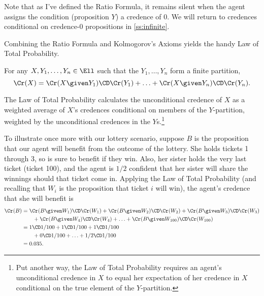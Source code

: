 Note that as I've defined the Ratio Formula, it remains silent when the agent assigns the condition (proposition $Y$) a credence of $0$. We will return to credences conditional on credence-$0$ propositions in \autoref{ss:infinite}.

Combining the Ratio Formula and Kolmogorov's Axioms yields the handy Law of Total Probability.
\begin{description}\label{p:LTP}
\item[Law of Total Probability.\,] {For any $X, Y_1, \ldots, Y_n \in \Ell$ such that the $Y_1, \ldots, Y_n$ form a finite partition, $$\Cr(X)=\Cr(X \given Y_1) \CD \Cr(Y_1) + \ldots + \Cr(X \given Y_n) \CD \Cr(Y_n).$$}
\end{description} 
The Law of Total Probability calculates the unconditional credence of $X$ as a weighted average of $X$'s credences conditional on members of the $Y$-partition, weighted by the unconditional credences in the $Y$s.\footnote
{Put another way, the Law of Total Probability requires an agent's unconditional credence in $X$ to equal her expectation of her credence in $X$ conditional on the true element of the $Y$-partition.}

To illustrate once more with our lottery scenario, suppose $B$ is the proposition that our agent will benefit from the outcome of the lottery. She holds tickets 1 through 3, so is sure to benefit if they win. Also, her sister holds the very last ticket (ticket 100), and the agent is $1/2$ confident that her sister will share the winnings should that ticket come in. Applying the Law of Total Probability (and recalling that $W_i$ is the proposition that ticket $i$ will win), the agent's credence that she will benefit is
\begin{equation}
\begin{aligned}
\Cr(B) &= \Cr(B \given W_1)\CD\Cr(W_1)+\Cr(B \given W_2)\CD\Cr(W_2)+\Cr(B \given W_3)\CD\Cr(W_3)\\
	   &\qquad +\Cr(B \given W_4)\CD\Cr(W_4)+\ldots+\Cr(B \given W_{100})\CD\Cr(W_{100})\\
	   &= 1 \CD 1/100 + 1 \CD 1/100 + 1 \CD 1/100\\
	   &\qquad + 0 \CD 1/100 + \ldots + 1/2 \CD 1/100\\
	   &=0.035.
\end{aligned}
\end{equation}

